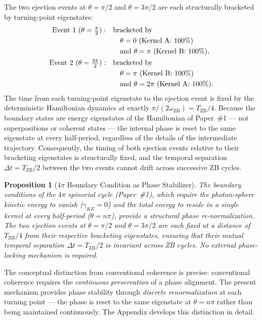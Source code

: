 \documentclass[%
 reprint, amsmath,amssymb, aps, prb, ]{revtex4-2}
\numberwithin{equation}{section}
\newtheorem{proposition}[theorem]{Proposition}
\newcommand{\iphase}{\theta}
\newcommand{\omZB}{\omega_{\text{ZB}}}
\begin{document}
The two ejection events at $\iphase = \pi/2$ and $\iphase = 3\pi/2$ are each structurally bracketed by turning-point eigenstates:
\begin{align}
\text{Event 1 }(\iphase = \tfrac{\pi}{2}):
&\quad \text{bracketed by}\notag\\
&\qquad \iphase = 0\ (\text{Kernel A: 100\%})\notag\\
&\qquad \text{and}\ \iphase = \pi\ (\text{Kernel B: 100\%}), \label{eq:bracket1}\\
\text{Event 2 }(\iphase = \tfrac{3\pi}{2}):
&\quad \text{bracketed by}\notag\\
&\qquad \iphase = \pi\ (\text{Kernel B: 100\%})\notag\\
&\qquad \text{and}\ \iphase = 2\pi\ (\text{Kernel A: 100\%}). \label{eq:bracket2}
\end{align}
The time from each turning-point eigenstate to the ejection event is fixed by the deterministic Hamiltonian dynamics at exactly $\pi/(2\omZB) = T_\mathrm{ZB}/4$.
Because the boundary states are energy eigenstates of the Hamiltonian of Paper~\#1 --- not superpositions or coherent states --- the internal phase is reset to the same eigenstate at every half-period, regardless of the details of the intermediate trajectory.
Consequently, the timing of both ejection events relative to their bracketing eigenstates is structurally fixed, and the temporal separation $\Delta t = T_\mathrm{ZB}/2$ between the two events cannot drift across successive ZB cycles.

\begin{proposition}[$4\pi$ Boundary Condition as Phase Stabilizer]
\label{prop:phase}
The boundary conditions of the $4\pi$ spinorial cycle (Paper~\#1), which require the photon-sphere kinetic energy to vanish ($\gamma_{KE} = 0$) and the total energy to reside in a single kernel at every half-period ($\iphase = n\pi$), provide a structural phase re-normalization.
The two ejection events at $\iphase = \pi/2$ and $\iphase = 3\pi/2$ are each fixed at a distance of $T_\mathrm{ZB}/4$ from their respective bracketing eigenstates, ensuring that their mutual temporal separation $\Delta t = T_\mathrm{ZB}/2$ is invariant across ZB cycles.
No external phase-locking mechanism is required.
\end{proposition}

The conceptual distinction from conventional coherence is precise: conventional coherence requires the \emph{continuous preservation} of a phase alignment. The present mechanism provides phase stability through \emph{discrete renormalization} at each turning point --- the phase is reset to the same eigenstate at $\iphase = n\pi$ rather than being maintained continuously. The Appendix develops this distinction in detail.
\end{document}
